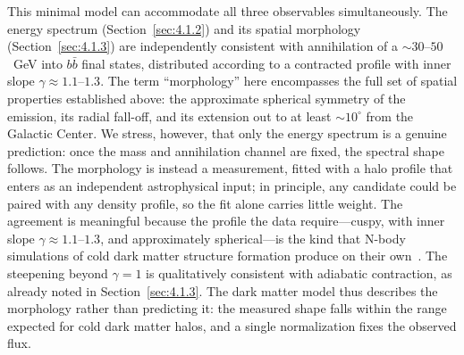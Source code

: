 This minimal model can accommodate all three observables simultaneously.
The \GCE energy spectrum (Section~\ref{sec:4.1.2}) and its spatial morphology (Section~\ref{sec:4.1.3}) are independently consistent with annihilation of a $\sim 30$--$50$~GeV \WIMP into $b\bar{b}$ final states, distributed according to a contracted \NFW profile with inner slope $\gamma \approx 1.1$--$1.3$.
The term ``morphology'' here encompasses the full set of spatial properties established above: the approximate spherical symmetry of the emission, its radial fall-off, and its extension out to at least $\sim 10^\circ$ from the Galactic Center.
We stress, however, that only the energy spectrum is a genuine prediction: once the \WIMP mass and annihilation channel are fixed, the spectral shape follows.
The morphology is instead a measurement, fitted with a halo profile that enters as an independent astrophysical input; in principle, any \WIMP candidate could be paired with any density profile, so the fit alone carries little weight.
The agreement is meaningful because the profile the data require---cuspy, with inner slope $\gamma \approx 1.1$--$1.3$, and approximately spherical---is the kind that N-body simulations of cold dark matter structure formation produce on their own~\cite{Navarro:1996gj,Springel:2008cc}.
The steepening beyond $\gamma = 1$ is qualitatively consistent with adiabatic contraction, as already noted in Section~\ref{sec:4.1.3}.
The dark matter model thus describes the morphology rather than predicting it: the measured shape falls within the range expected for cold dark matter halos, and a single normalization fixes the observed flux.

